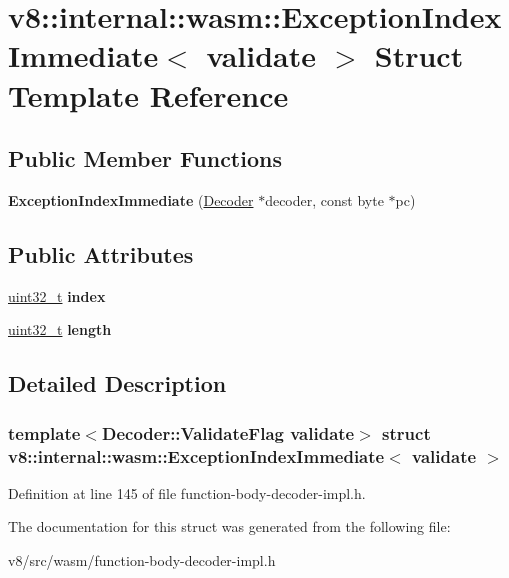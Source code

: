 \hypertarget{structv8_1_1internal_1_1wasm_1_1ExceptionIndexImmediate}{}\section{v8\+:\+:internal\+:\+:wasm\+:\+:Exception\+Index\+Immediate$<$ validate $>$ Struct Template Reference}
\label{structv8_1_1internal_1_1wasm_1_1ExceptionIndexImmediate}
\subsection*{Public Member Functions}
\begin{DoxyCompactItemize}
\item 
\mbox{\label{structv8_1_1internal_1_1wasm_1_1ExceptionIndexImmediate_af6b011ed20d09c902e71133d71531f4a}} 
{\bfseries Exception\+Index\+Immediate} (\mbox{\hyperlink{classv8_1_1internal_1_1wasm_1_1Decoder}{Decoder}} $\ast$decoder, const byte $\ast$pc)
\end{DoxyCompactItemize}
\subsection*{Public Attributes}
\begin{DoxyCompactItemize}
\item 
\mbox{\label{structv8_1_1internal_1_1wasm_1_1ExceptionIndexImmediate_ab9495515d30c9c1e5145633d98a925e6}} 
\mbox{\hyperlink{classuint32__t}{uint32\+\_\+t}} {\bfseries index}
\item 
\mbox{\label{structv8_1_1internal_1_1wasm_1_1ExceptionIndexImmediate_a0442c16546022dd843358af6b3ebdbb5}} 
\mbox{\hyperlink{classuint32__t}{uint32\+\_\+t}} {\bfseries length}
\end{DoxyCompactItemize}


\subsection{Detailed Description}
\subsubsection*{template$<$Decoder\+::\+Validate\+Flag validate$>$\newline
struct v8\+::internal\+::wasm\+::\+Exception\+Index\+Immediate$<$ validate $>$}



Definition at line 145 of file function-\/body-\/decoder-\/impl.\+h.



The documentation for this struct was generated from the following file\+:\begin{DoxyCompactItemize}
\item 
v8/src/wasm/function-\/body-\/decoder-\/impl.\+h\end{DoxyCompactItemize}
